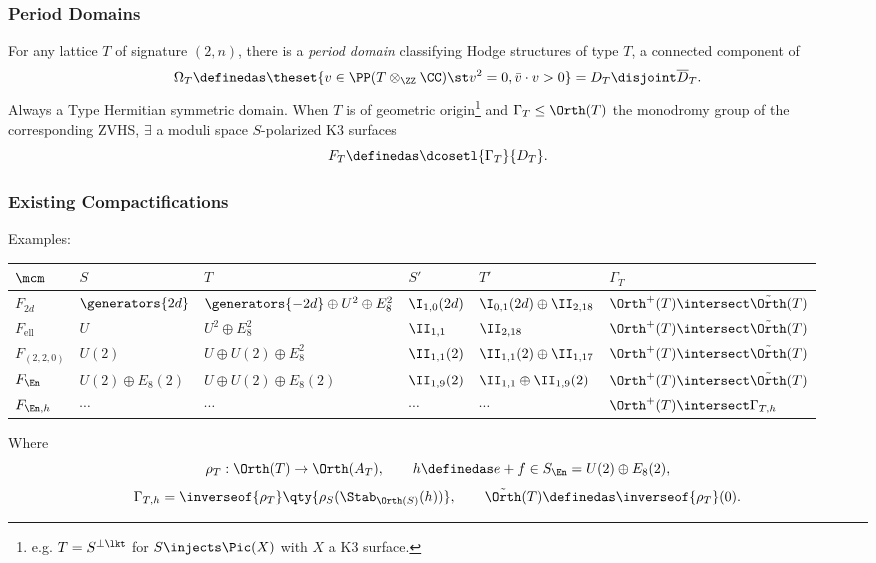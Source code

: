 \documentclass{beamer}
\begin{document}
{\begin{frame}
\end{frame}
\begin{frame}\frametitle{Period Domains}
For any lattice $T$ of signature $(2, n)$, there is a \textit{period domain} classifying Hodge structures of type $T$, a connected component of
\[
\Omega_T \definedas \theset{v\in \PP(T \otimes_\ZZ \CC) \st v^2 = 0, \bar{v}\cdot v > 0} = D_T \disjoint \overline{D}_T
.\]
Always a Type \IV Hermitian symmetric domain.
When $T$ is of geometric origin\footnote{e.g. $T = S^{\perp \lkt}$ for $S \injects \Pic(X)$ with $X$ a K3 surface.} and $\Gamma_T \leq \Orth(T)$ the monodromy group of the corresponding \textrm{ZVHS}, $\exists$ a moduli space $S$-polarized K3 surfaces
\[
F_T \definedas \dcosetl{\Gamma_T}{D_T}
.\]
\end{frame}
\begin{frame}\frametitle{Existing Compactifications}
Examples:
{\tiny \begin{center}
\begin{tabular}{l|ll|ll|l}
	$\mcm$ & $S$ & $T$ & $S'$ & $T'$ & $\Gamma_T$ \\ \hline
	$F_{2d}$
		& $\generators{2d}$
		& $\generators{-2d} \oplus U^2 \oplus E_8^2$
		& $\I_{1,0}(2d)$
		& $\I_{0,1}(2d) \oplus \II_{2,18}$ 
		& $\Orth^+(T) \intersect \tilde{\Orth}(T)$ \\

	$F_{\mathrm{ell}}$\cite{ABE22}
		& $U$
		& $U^2 \oplus E_8^2$
		& $\II_{1,1}$
		& $\II_{2,18}$ 
		& $\Orth^+(T) \intersect \tilde{\Orth}(T)$ \\

	$F_{(2,2,0)}$\cite{AE22}
		& $U(2)$
		& $U \oplus U(2) \oplus E_8^2$
		& $\II_{1,1}(2)$
		& $\II_{1,1}(2) \oplus \II_{1,17}$ 
		& $\Orth^+(T) \intersect \tilde{\Orth}(T)$ \\

	$F_{\En}$\cite{Ste95a}
		& $U(2) \oplus E_8(2)$
		& $U \oplus U(2) \oplus E_8(2)$
		& $\II_{1,9}(2)$
		& $\II_{1,1} \oplus \II_{1,9}(2)$ 
		& $\Orth^+(T) \intersect \tilde{\Orth}(T)$ \\
		
	$F_{\En, h}$\cite{Ste95a}
		& $\cdots$
		& $\cdots$
		& $\cdots$
		& $\cdots$
		& $\Orth^+(T) \intersect \Gamma_{T, h}$ \\
\end{tabular}
\end{center}
}

Where
\[
\rho_T: \Orth(T) \to \Orth(A_T), \qquad h \definedas e + f \in S_{\En} = U(2) \oplus E_8(2)
,\]
\[
\Gamma_{T, h} = \inverseof{\rho_T}\qty{ \rho_S(\Stab_{\Orth(S)}(h) ) },
\qquad
\tilde{\Orth}(T) \definedas  \inverseof{\rho_T}(0)
.\]


\end{frame}}
\end{document}
